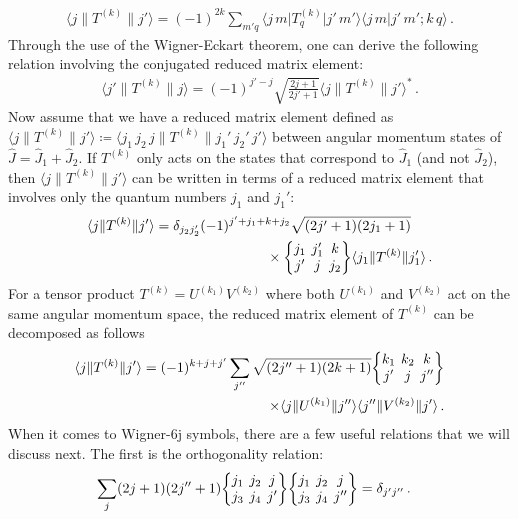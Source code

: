 \documentclass[../Thesis-IJspeert.tex]{subfiles}
\begin{document}
\begin{align}
\label{inversewigner}
\langle j \| T^{(k)} \| j' \rangle = (-1)^{2k}\sum_{m'q} \langle j\, m \vert  T^{(k)}_q \vert j'\, m' \rangle \langle j\, m \vert j'\, m'; k\, q \rangle\,.
\end{align}
Through the use of the Wigner-Eckart theorem, one can derive the following relation involving the conjugated reduced matrix element:
\begin{align}
\label{ccreducedmatrixelement}
\langle j' \| T^{(k)} \| j \rangle = (-1)^{j'-j}\sqrt{\frac{2j+1}{2j'+1}}\langle j \| T^{(k)} \| j' \rangle^*\,.
\end{align}
Now assume that we have a reduced matrix element defined as $\langle j \| T^{(k)} \| j' \rangle \coloneqq \langle j_1\, j_2\, j \| T^{(k)} \| j_1'\,j_2'\,j' \rangle$ between angular momentum states of $\hat{J}=\hat{J}_1+\hat{J}_2$. If $T^{(k)}$ only acts on the states that correspond to $\hat{J}_1$ (and not $\hat{J}_2$), then $\langle j \| T^{(k)} \| j' \rangle$ can be written in terms of a reduced matrix element that involves only the quantum numbers $j_1$ and $j_1'$:
\begin{align}
\label{reducedmatrixelementonecomponent}
\begin{split}
\langle j \| T^{(k)} \| j' \rangle &= \delta_{j_2 j_2'} (-1)^{j'+j_1+k+j_2}\sqrt{(2j'+1)(2j_1+1)}\\ &\hspace{8em}\times\tj{j_1}{j_1'}{k}{j'}{j}{j_2} \langle j_1 \| T^{(k)} \| j_1' \rangle \,.
\end{split}
\end{align}
For a tensor product $T^{(k)}=U^{(k_1)}V^{(k_2)}$ where both $U^{(k_1)}$ and $V^{(k_2)}$ act on the same angular momentum space, the reduced matrix element of $T^{(k)}$ can be decomposed as follows
\begin{align}
\label{splitreducedmatrixelement}
\begin{split}
\langle j \| T^{(k)} \| j' \rangle = (-1)^{k+j+j'}\sum_{j''}\sqrt{(2j''+1)(2k+1)} \tj{k_1}{k_2}{k}{j'}{j}{j''} \\ \times \langle j \| U^{(k_1)} \| j'' \rangle \langle j'' \| V^{(k_2)} \| j' \rangle\,.
\end{split}
\end{align}
When it comes to Wigner-6j symbols, there are a few useful relations that we will discuss next. The first is the orthogonality relation:
\begin{align}
\label{orthogonality6j}
& \sum_j(2 j+1)\left(2 j''+1\right)\tj{j_1}{j_2}{j}{j_3}{j_4}{j'}\tj{j_1}{j_2}{j}{j_3}{j_4}{j''}=\delta_{j' j''}\,.
\end{align}
\end{document}
